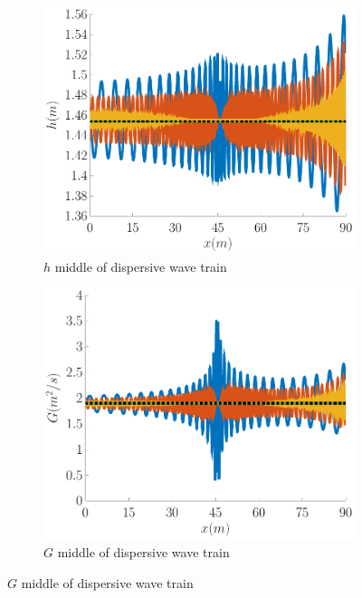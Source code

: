 \documentclass[10pt]{article}
\begin{document}
\begin{figure}
	\centering
	\begin{subfigure}{0.32\textwidth}
		\centering
		\includegraphics[width=\textwidth]{./Figures/Simulations/Study/Serre2SWWECloser/hMid.pdf}
		\caption{$h$ middle of dispersive wave train}
	\end{subfigure}
	\begin{subfigure}{0.32\textwidth}
		\centering
		\includegraphics[width=\textwidth]{./Figures/Simulations/Study/Serre2SWWECloser/GMid.pdf}
		\caption{$G$ middle of dispersive wave train}
	\end{subfigure}

\end{figure}
\end{document}
